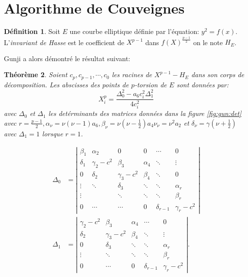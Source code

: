 \documentclass[10pt,a4paper]{book}
\theoremstyle{plain}
\newtheorem{thm}{Théorème}[chapter]
\theoremstyle{definition}
\theoremstyle{definition}
\theoremstyle{definition}
\theoremstyle{definition}
\newtheorem{defi}[thm]{Définition}
\theoremstyle{remark}
\theoremstyle{remark}
\theoremstyle{definition}
\begin{document}
\section{Algorithme de Couveignes}

\begin{defi}
Soit $E$ une courbe elliptique définie par l'équation: $y^2=f(x)$. L'\emph{invariant de Hasse} est le coefficient de $X^{p-1}$ dans $f(X)^{\frac{p-1}{2}}$ on le note $H_{E}$.
\end{defi}

Gunji a alors démontré le résultat suivant:

\begin{thm}
\label{thm:Gunji}
Soient $c_p, c_{p-1}, \cdots, c_{0}$ les racines de $X^{p-1}-H_{E}$ dans son corps de décomposition. Les abscisses des points de $p$-torsion de $E$ sont données par: 
\begin{equation*}
X^{p}_i=\frac{\Delta_0^2-a_6c_i^2\Delta_1^2}{4c_i^2}
\end{equation*}
avec $\Delta_0$ et $\Delta_1$ les detérminants des matrices données dans la figure \ref{fig:gun:det} avec $r=\frac{p-1}{2}, \alpha_{\nu}=\nu (\nu -1 ) a_6, \beta_{\nu}=\nu(\nu-\frac{1}{2})a_4 \nu_{\nu}=\nu^2a_2$ et $\delta_{\nu}=\gamma(\nu + \frac{1}{2})$ avec $\Delta_1=1$ lorsque $r=1$.
\end{thm}


\begin{equation*}
\begin{alignedat}{1}
\Delta_0 &=\left| 
\begin{matrix}
\beta_1 & \alpha_2 & 0 & 0 & \cdots & 0\\
\delta_1 & \gamma_2 - c^2 & \beta_3 & \alpha_4 & \ddots & \vdots \\
0 & \delta_2 & \gamma_3 - c^2 & \beta_4 & \ddots & 0 \\
\vdots & \ddots & \delta_3 & \ddots & \ddots & \alpha_r \\
\vdots & & \ddots  & \ddots & \ddots & \beta_r \\
0 & \cdots & \cdots & 0 & \delta_{r-1} & \gamma_r - c^2 
\end{matrix}
\right| \\
\Delta_1 &= \left| 
\begin{matrix}
\gamma_2-c^2 & \beta_3 & \alpha_4 & \cdots & 0 \\
\delta_2 & \gamma_3 - c^2 & \beta_4 & \ddots & \vdots \\
0 & \delta_3 & \ddots & \ddots & \alpha_r \\
\vdots & \ddots & \ddots & \ddots & \beta_r \\
0 & \cdots & 0 & \delta_{r-1} & \gamma_r-c^2
\end{matrix}
\right|.
\end{alignedat}
\end{equation*}
\end{document}
